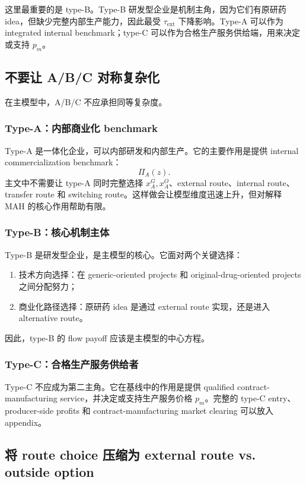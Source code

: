 \documentclass[12pt]{article}
\newcommand{\tauext}{\tau_{\mathrm{ext}}}
\begin{document}
这里最重要的是 type-B。Type-B 研发型企业是机制主角，因为它们有原研药 idea，但缺少完整内部生产能力，因此最受 $\tauext$ 下降影响。Type-A 可以作为 integrated internal benchmark；type-C 可以作为合格生产服务供给端，用来决定或支持 $p_m$。

\subsection{不要让 A/B/C 对称复杂化}

在主模型中，A/B/C 不应承担同等复杂度。

\subsubsection{Type-A：内部商业化 benchmark}

Type-A 是一体化企业，可以内部研发和内部生产。它的主要作用是提供 internal commercialization benchmark：
\[
\Pi_A(z).
\]
主文中不需要让 type-A 同时完整选择 $x_A^G,x_A^O$、external route、internal route、transfer route 和 switching route。这样做会让模型维度迅速上升，但对解释 MAH 的核心作用帮助有限。

\subsubsection{Type-B：核心机制主体}

Type-B 是研发型企业，是主模型的核心。它面对两个关键选择：
\begin{enumerate}
    \item 技术方向选择：在 generic-oriented projects 和 original-drug-oriented projects 之间分配努力；
    \item 商业化路径选择：原研药 idea 是通过 external route 实现，还是进入 alternative route。
\end{enumerate}

因此，type-B 的 flow payoff 应该是主模型的中心方程。

\subsubsection{Type-C：合格生产服务供给者}

Type-C 不应成为第二主角。它在基线中的作用是提供 qualified contract-manufacturing service，并决定或支持生产服务价格 $p_m$。完整的 type-C entry、producer-side profits 和 contract-manufacturing market clearing 可以放入 appendix。

\subsection{将 route choice 压缩为 external route vs. outside option}
\end{document}
